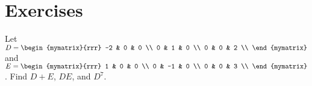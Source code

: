 \section*{Exercises}


\begin{ex}
  Let $D=\begin{mymatrix}{rrr}
    -2 & 0 & 0 \\
    0 & 1 & 0 \\
    0 & 0 & 2 \\
  \end{mymatrix}$ and
  $E=\begin{mymatrix}{rrr}
    1 & 0 & 0 \\
    0 & -1 & 0 \\
    0 & 0 & 3 \\
  \end{mymatrix}$.
  Find $D+E$, $DE$, and $D^{7}$.
\end{ex}

